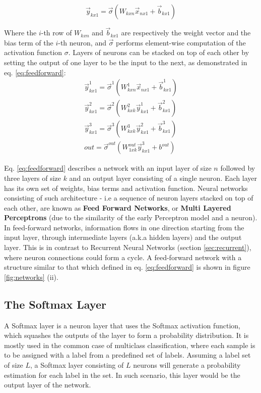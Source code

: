 \begin{equation}
    \vec{y}_{kx1} = \vec{\sigma}({W_{kxn}\vec{x}_{nx1}} + \vec{b}_{kx1})
    \label{eq:neuronlayer}
\end{equation}

Where the \(i\)-th row of \(W_{kxn}\) and \(\vec{b}_{kx1}\) are respectively the weight vector and the bias term of the \(i\)-th neuron, and \(\vec{\sigma}\) performs element-wise computation of the activation function \(\sigma\). Layers of neurons can be stacked on top of each other by setting the output of one layer to be the input to the next, as demonstrated in eq. \ref{eq:feedforward}:
\begin{equation}
    \begin{split}
    \vec{y}^1_{kx1} = \vec{\sigma}^1({W^1_{kxn}\vec{x}_{nx1}} + \vec{b}^1_{kx1}) \\
    \vec{y}^2_{kx1} = \vec{\sigma}^2({W^2_{kxk}\vec{y}^1_{kx1}} + \vec{b}^2_{kx1}) \\
    \vec{y}^3_{kx1} = \vec{\sigma}^3({W^3_{kxk}\vec{y}^2_{kx1}} + \vec{b}^3_{kx1}) \\
    out = \vec{\sigma}^{out}({W^{out}_{1xk}\vec{y}^3_{kx1}} + b^{out})
    \end{split}
    \label{eq:feedforward}
\end{equation}

Eq. \ref{eq:feedforward} describes a network with an input layer of size \(n\) followed by three layers of size \(k\) and an output layer consisting of a single neuron. Each layer has its own set of weights, bias terms and activation function. Neural networks consisting of such architecture - i.e a sequence of neuron layers stacked on top of each other, are known as \textbf{Feed Forward Networks}, or \textbf{Multi Layered Perceptrons} (due to the similarity of the early Perceptron model and a neuron). In feed-forward networks, information flows in one direction starting from the input layer, through intermediate layers (a.k.a hidden layers) and the output layer. This is in contrast to Recurrent Neural Networks (section \ref{sec:recurrent}), where neuron connections could form a cycle. A feed-forward network with a structure similar to that which defined in eq. \ref{eq:feedforward} is shown in figure \ref{fig:networks} (ii).

\subsection{The Softmax Layer}
A Softmax layer is a neuron layer that uses the Softmax activation function, which squashes the outputs of the layer to form a probability distribution. It is mostly used in the common case of multiclass classification, where each sample is to be assigned with a label from a predefined set of labels. Assuming a label set of size $L$, a Softmax layer consisting of $L$ neurons will generate a probability estimation for each label in the set. In such scenario, this layer would be the output layer of the network.

